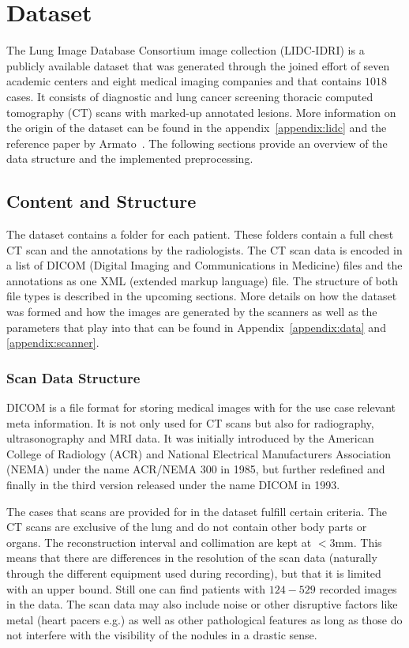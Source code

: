 \documentclass[../Thesis.tex]{subfiles}
\begin{document}
\chapter{Dataset}\label{chap:data}
The Lung Image Database Consortium image collection (LIDC-IDRI) is a publicly available dataset that was generated through the joined effort of seven academic centers and eight medical imaging companies and that contains $1018$ cases. It consists of diagnostic and lung cancer screening thoracic computed tomography (CT) scans with marked-up annotated lesions. More information on the origin of the dataset can be found in the appendix~\ref{appendix:lidc} and the reference paper by Armato~\cite{armato2011lung}. The following sections provide an overview of the data structure and the implemented preprocessing.

\section{Content and Structure}
The dataset contains a folder for each patient. These folders contain a full chest CT scan and the annotations by the radiologists. The CT scan data is encoded in a list of DICOM (Digital Imaging and Communications in Medicine) files and the annotations as one XML (extended markup language) file. The structure of both file types is described in the upcoming sections. More details on how the dataset was formed and how the images are generated by the scanners as well as the parameters that play into that can be found in Appendix~\ref{appendix:data} and \ref{appendix:scanner}.

\subsection{Scan Data Structure}
DICOM is a file format for storing medical images with for the use case relevant meta information. It is not only used for CT scans but also for radiography, ultrasonography and MRI data. It was initially introduced by the American College of Radiology (ACR) and National Electrical Manufacturers Association (NEMA) under the name ACR/NEMA 300 in 1985, but further redefined and finally in the third version released under the name DICOM in 1993\cite{pianykh2008}.

The cases that scans are provided for in the dataset fulfill certain criteria. The CT scans are exclusive of the lung and do not contain other body parts or organs. The reconstruction interval and collimation are kept at $<3$mm. This means that there are differences in the resolution of the scan data (naturally through the different equipment used during recording), but that it is limited with an upper bound. Still one can find patients with $124-529$ recorded images in the data. The scan data may also include noise or other disruptive factors like metal (heart pacers e.g.) as well as other pathological features as long as those do not interfere with the visibility of the nodules in a drastic sense.
\end{document}
